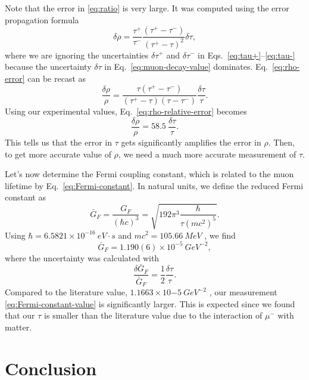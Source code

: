 \documentclass{../paper}
\begin{document}
Note that the error in \eqref{eq:ratio} is very large. It was computed using the error propagation formula
\begin{equation}\label{eq:rho-error}
  \delta\rho = \frac{\tau^+}{\tau^-} \frac{(\tau^+ - \tau^-)}{(\tau^+ - \tau)^2} \delta\tau,
\end{equation}
where we are ignoring the uncertainties $\delta\tau^+$ and $\delta\tau^-$ in Eqs.~\eqref{eq:tau+}--\eqref{eq:tau-} because the uncertainty $\delta\tau$ in Eq.~\eqref{eq:muon-decay-value} dominates. Eq.~\eqref{eq:rho-error} can be recast as
\begin{equation}\label{eq:rho-relative-error}
  \frac{\delta\rho}{\rho} = \frac{\tau (\tau^+ - \tau^-)}{(\tau^+ - \tau) (\tau - \tau^-)} \frac{\delta\tau}{\tau}.
\end{equation}
Using our experimental values, Eq.~\eqref{eq:rho-relative-error} becomes
\begin{equation}\label{eq:rho-relative-error-numeric}
  \frac{\delta\rho}{\rho} = 58.5\ \frac{\delta\tau}{\tau}.
\end{equation}
This tells us that the error in $\tau$ gets significantly amplifies the error in $\rho$. Then, to get more accurate value of $\rho$, we need a much more accurate measurement of $\tau$.

Let's now determine the Fermi coupling constant, which is related to the muon lifetime by Eq.~\eqref{eq:Fermi-constant}. In natural units, we define the reduced Fermi constant as
\begin{equation}
  \bar G_F = \frac{G_F}{(\hbar c)^3} = \sqrt{ 192 \pi^3 \frac{\hbar}{\tau (m c^2)^5} }.
\end{equation}
Using $\hbar = 6.5821 \times 10^{-16} \ eV \cdot s$ \cite{NIST_hbar} and $m c^2 = 105.66 \ MeV$ \cite{NIST_muon}, we find
\begin{equation}\label{eq:Fermi-constant-value}
  \bar G_F = 1.190(6) \times 10^{-5} \ GeV^{-2},
\end{equation}
where the uncertainty was calculated with
\begin{equation}
  \frac{\delta \bar G_F}{\bar G_F} = \frac{1}{2} \frac{\delta \tau}{\tau}.
\end{equation}
Compared to the literature value, $1.1663 \times 10{-5} \ GeV^{-2}$ \cite{NIST_Fermi}, our measurement \eqref{eq:Fermi-constant-value} is significantly larger. This is expected since we found that our $\tau$ is smaller than the literature value due to the interaction of $\mu^-$ with matter.

\section{Conclusion} \label{sec:conclusion}
\end{document}
